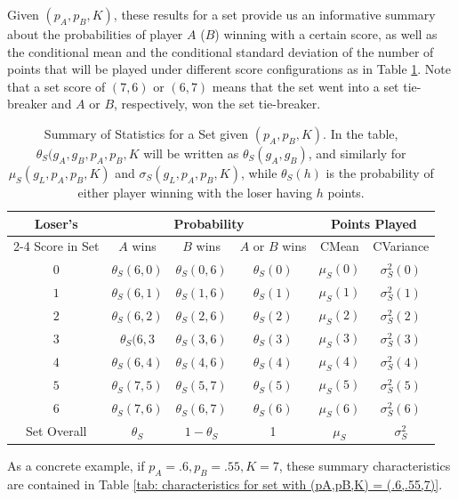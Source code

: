 \documentclass[11pt]{article}
\theoremstyle{plain}
\theoremstyle{definition}
\begin{document}
Given $(p_A,p_B,K)$, these results for a set provide us an informative summary about the probabilities of player $A$ ($B$) winning with a certain score, as well as the conditional mean and the conditional standard deviation of the number of points that will be played under different score configurations as in Table \ref{tab: set statistics}. Note that a set score of $(7,6)$ or $(6,7)$ means that the set went into a set tie-breaker and $A$ or $B$, respectively, won the set tie-breaker.
%
\begin{table}[h]
\begin{center}
\begin{tabular}{||c||c|c|c||c|c||} \hline
Loser's & \multicolumn{3}{c||}{Probability} & \multicolumn{2}{c||}{Points Played} \\ \cline{2-4} \cline{5-6}
Score in Set & $A$ wins & $B$ wins & $A$ or $B$ wins & CMean & CVariance \\ \hline\hline
$0$ & $\theta_S(6,0)$ & $\theta_S(0,6)$ &  $\theta_S(0)$ & $\mu_S(0)$ & $\sigma_S^2(0)$ \\ 
$1$ & $\theta_S(6,1)$ & $\theta_S(1,6)$ & $\theta_S(1)$ & $\mu_S(1)$ & $\sigma_S^2(1)$ \\ 
$2$ & $\theta_S(6,2)$ & $\theta_S(2,6)$ & $\theta_S(2)$ & $\mu_S(2)$ & $\sigma_S^2(2)$ \\ 
$3$ & $\theta_S(6,3$ & $\theta_S(3,6)$ & $\theta_S(3)$ & $\mu_S(3)$ & $\sigma_S^2(3)$ \\ 
$4$ & $\theta_S(6,4)$ & $\theta_S(4,6)$ & $\theta_S(4)$ & $\mu_S(4)$ & $\sigma_S^2(4)$ \\ 
$5$ & $\theta_S(7,5)$ & $\theta_S(5,7)$ &  $\theta_S(5)$ & $\mu_S(5)$ & $\sigma_S^2(5)$ \\ 
$6$ & $\theta_S(7,6)$ & $\theta_S(6,7)$ &  $\theta_S(6)$ & $\mu_S(6)$ & $\sigma_S^2(6)$ \\\hline
Set Overall & $\theta_S$ & $1 - {\theta}_S$ & 1 & $\mu_S$ & $\sigma_S^2$ \\ \hline\hline
\end{tabular}
\caption{Summary of Statistics for a Set given $(p_A,p_B,K)$. In the table, $\theta_S(g_A,g_B,p_A,p_B,K$ will be written as $\theta_S(g_A,g_B)$, and similarly for $\mu_S(g_L,p_A,p_B,K)$ and $\sigma_S(g_L,p_A,p_B,K)$, while $\theta_S(h)$ is the probability of either player winning with the loser having $h$ points.}
\label{tab: set statistics}
\end{center}
\end{table}
%
As a concrete example, if $p_A=.6,p_B=.55,K=7$, these summary characteristics are contained in Table \ref{tab: characteristics for set with (pA,pB,K) = (.6,.55,7)}.
\end{document}
